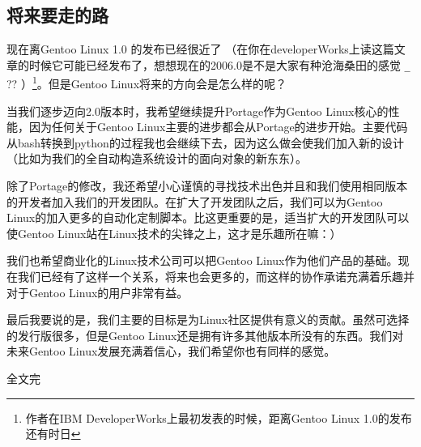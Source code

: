 \subsection{将来要走的路}

现在离Gentoo Linux 1.0 的发布已经很近了
（在你在developerWorks上读这篇文章的时候它可能已经发布了，想想现在的2006.0是不是大家有种沧海桑田的感觉
\verb ^_^ ??
）\footnote{作者在IBM DeveloperWorks上最初发表的时候，距离Gentoo Linux 1.0的发布还有时日}。但是Gentoo Linux将来的方向会是怎么样的呢？

当我们逐步迈向2.0版本时，我希望继续提升Portage作为Gentoo Linux核心的性能，因为任何关于Gentoo Linux主要的进步都会从Portage的进步开始。主要代码从bash转换到python的过程我也会继续下去，因为这么做会使我们加入新的设计（比如为我们的全自动构造系统设计的面向对象的新东东）。

除了Portage的修改，我还希望小心谨慎的寻找技术出色并且和我们使用相同版本的开发者加入我们的开发团队。在扩大了开发团队之后，我们可以为Gentoo Linux的加入更多的自动化定制脚本。比这更重要的是，适当扩大的开发团队可以使Gentoo Linux站在Linux技术的尖锋之上，这才是乐趣所在嘛：）

我们也希望商业化的Linux技术公司可以把Gentoo Linux作为他们产品的基础。现在我们已经有了这样一个关系，将来也会更多的，而这样的协作承诺充满着乐趣并对于Gentoo Linux的用户非常有益。

最后我要说的是，我们主要的目标是为Linux社区提供有意义的贡献。虽然可选择的发行版很多，但是Gentoo Linux还是拥有许多其他版本所没有的东西。我们对未来Gentoo Linux发展充满着信心，我们希望你也有同样的感觉。

\vfill

\begin{center}
{\Huge 全文完}
\end{center}

\vfill